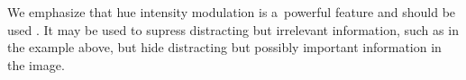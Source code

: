 

\purplebox{}
We emphasize that hue intensity modulation is a~powerful feature and should be used . It may be used to supress distracting but irrelevant information, such as in the example above, but  hide distracting but possibly important information in the image.
\tcbe